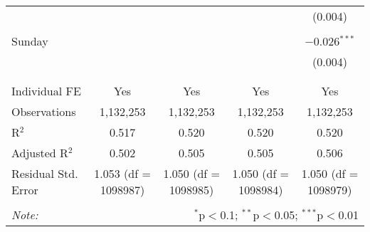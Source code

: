 \documentclass[
]{article}
\begin{document}
\begin{table}[!htbp]
{\begin{tabular}{@{\extracolsep{5pt}}lcccc}
  &  &  &  & (0.004) \\ 
  & & & & \\ 
 Sunday &  &  &  & $-$0.026$^{***}$ \\ 
  &  &  &  & (0.004) \\ 
  & & & & \\ 
\hline \\[-1.8ex] 
Individual FE & Yes & Yes & Yes & Yes \\ 
Observations & 1,132,253 & 1,132,253 & 1,132,253 & 1,132,253 \\ 
R$^{2}$ & 0.517 & 0.520 & 0.520 & 0.520 \\ 
Adjusted R$^{2}$ & 0.502 & 0.505 & 0.505 & 0.506 \\ 
Residual Std. Error & 1.053 (df = 1098987) & 1.050 (df = 1098985) & 1.050 (df = 1098984) & 1.050 (df = 1098979) \\ 
\hline 
\hline \\[-1.8ex] 
\textit{Note:}  & \multicolumn{4}{r}{$^{*}$p$<$0.1; $^{**}$p$<$0.05; $^{***}$p$<$0.01} \\ 
\end{tabular}
} 
\end{table} 
\newpage
\end{document}

